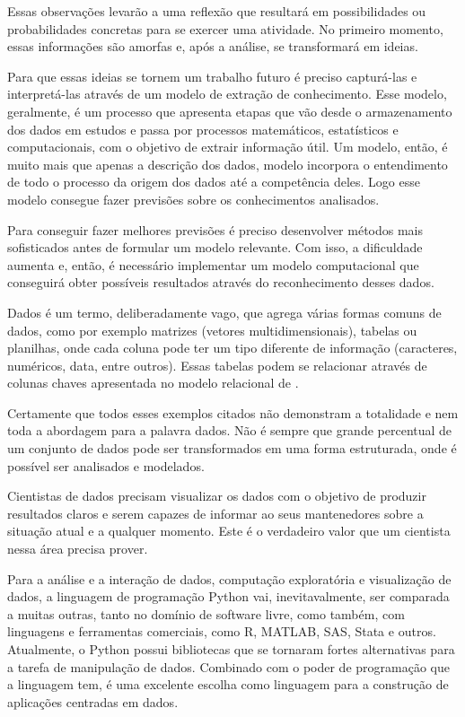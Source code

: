 Essas observações levarão a uma reflexão que resultará em possibilidades ou probabilidades concretas para se exercer uma atividade. No primeiro momento, essas informações são amorfas e, após a análise, se transformará em ideias.

Para que essas ideias se tornem um trabalho futuro é preciso capturá-las e interpretá-las através de um modelo de extração de conhecimento. Esse modelo, geralmente, é um processo que apresenta etapas que vão desde o armazenamento dos dados em estudos e passa por processos matemáticos, estatísticos e computacionais, com o objetivo de extrair informação útil. Um modelo, então, é muito mais que apenas a descrição dos dados, modelo incorpora o entendimento de todo o processo da origem dos dados até a competência deles. Logo esse modelo consegue fazer previsões sobre os conhecimentos analisados.

Para conseguir fazer melhores previsões é preciso desenvolver métodos mais sofisticados antes de formular um modelo relevante. Com isso, a dificuldade aumenta e, então, é necessário implementar um modelo computacional que conseguirá obter possíveis resultados através do reconhecimento desses dados.

Dados é um termo, deliberadamente vago, que agrega várias formas comuns de dados, como por exemplo matrizes (vetores multidimensionais), tabelas ou planilhas, onde cada coluna pode ter um tipo diferente de informação (caracteres, numéricos, data, entre outros). Essas tabelas podem se relacionar através de colunas chaves apresentada no modelo relacional de .

Certamente que todos esses exemplos citados não demonstram a totalidade e nem toda a abordagem para a palavra dados. Não é sempre que grande percentual de um conjunto de dados pode ser transformados em uma forma estruturada, onde é possível ser analisados e modelados.

Cientistas de dados precisam visualizar os dados com o objetivo de produzir resultados claros e serem capazes de informar ao seus mantenedores sobre a situação atual e a qualquer momento. Este é o verdadeiro valor que um cientista nessa área precisa prover.

Para a análise e a interação de dados, computação exploratória e visualização de dados, a linguagem de programação Python vai, inevitavalmente, ser comparada a muitas outras, tanto no domínio de software livre, como também, com linguagens e ferramentas comerciais, como R, MATLAB, SAS, Stata e outros. Atualmente, o Python possui bibliotecas que se tornaram fortes alternativas para a tarefa de manipulação de dados. Combinado com o poder de programação que a linguagem tem, é uma excelente escolha como linguagem para a construção de aplicações centradas em dados.

